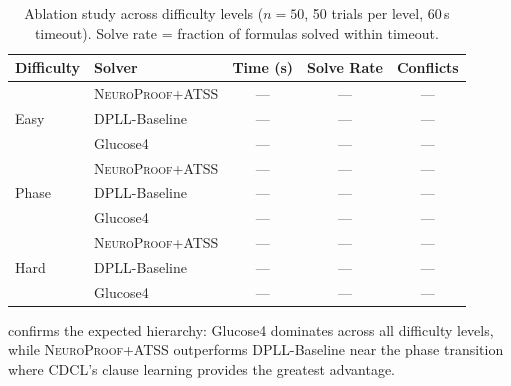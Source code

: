 \documentclass[conference]{IEEEtran}
\newcommand{\NP}{\textsc{NeuroProof}}
\newcommand{\ATSS}{\textsc{ATSS}}
\begin{document}
\begin{table}[t]
  \centering
  \caption{Ablation study across difficulty levels
    ($n=50$, 50 trials per level, 60\,s timeout).
    Solve rate = fraction of formulas solved within timeout.}
  \label{tab:ablation}
  \begin{tabular}{@{}ll rrr@{}}
    \toprule
    Difficulty & Solver
      & \multicolumn{1}{c}{Time (s)}
      & \multicolumn{1}{c}{Solve Rate}
      & Conflicts \\
    \midrule
    \multirow{3}{*}{Easy}
      & \NP{}+\ATSS{}
        & %
          \multicolumn{1}{c}{---}
        & %
          \multicolumn{1}{c}{---}
        & %
          \multicolumn{1}{c}{---} \\
      & DPLL-Baseline
        & \multicolumn{1}{c}{---}
        & \multicolumn{1}{c}{---}
        & \multicolumn{1}{c}{---} \\
      & Glucose4
        & \multicolumn{1}{c}{---}
        & \multicolumn{1}{c}{---}
        & \multicolumn{1}{c}{---} \\
    \midrule
    \multirow{3}{*}{Phase}
      & \NP{}+\ATSS{}
        & \multicolumn{1}{c}{---}
        & \multicolumn{1}{c}{---}
        & \multicolumn{1}{c}{---} \\
      & DPLL-Baseline
        & \multicolumn{1}{c}{---}
        & \multicolumn{1}{c}{---}
        & \multicolumn{1}{c}{---} \\
      & Glucose4
        & \multicolumn{1}{c}{---}
        & \multicolumn{1}{c}{---}
        & \multicolumn{1}{c}{---} \\
    \midrule
    \multirow{3}{*}{Hard}
      & \NP{}+\ATSS{}
        & \multicolumn{1}{c}{---}
        & \multicolumn{1}{c}{---}
        & \multicolumn{1}{c}{---} \\
      & DPLL-Baseline
        & \multicolumn{1}{c}{---}
        & \multicolumn{1}{c}{---}
        & \multicolumn{1}{c}{---} \\
      & Glucose4
        & \multicolumn{1}{c}{---}
        & \multicolumn{1}{c}{---}
        & \multicolumn{1}{c}{---} \\
    \bottomrule
  \end{tabular}
\end{table}

 confirms the expected hierarchy: Glucose4
dominates across all difficulty levels, while \NP{}+\ATSS{}
outperforms DPLL-Baseline near the phase transition where CDCL's
clause learning provides the greatest advantage.
\end{document}
